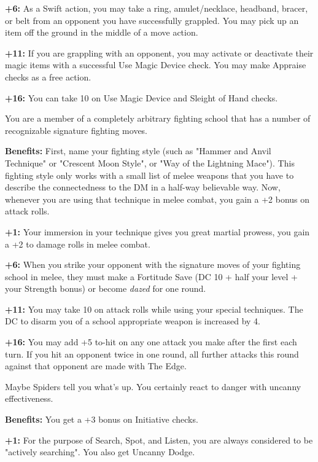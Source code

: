 \textbf{+6:} As a Swift action, you may take a ring, amulet/necklace, headband, bracer, or belt from an opponent you have successfully grappled. You may pick up an item off the ground in the middle of a move action.

\textbf{+11:} If you are grappling with an opponent, you may activate or deactivate their magic items with a successful Use Magic Device check. You may make Appraise checks as a free action.

\textbf{+16:} You can take 10 on Use Magic Device and Sleight of Hand checks.


You are a member of a completely arbitrary fighting school that has a number of recognizable signature fighting moves.

\textbf{Benefits:} First, name your fighting style (such as "Hammer and Anvil Technique" or "Crescent Moon Style", or "Way of the Lightning Mace"). This fighting style only works with a small list of melee weapons that you have to describe the connectedness to the DM in a half-way believable way. Now, whenever you are using that technique in melee combat, you gain a +2 bonus on attack rolls.

\textbf{+1:} Your immersion in your technique gives you great martial prowess, you gain a +2 to damage rolls in melee combat.

\textbf{+6:} When you strike your opponent with the signature moves of your fighting school in melee, they must make a Fortitude Save (DC 10 + half your level + your Strength bonus) or become \textit{dazed} for one round.

\textbf{+11:} You may take 10 on attack rolls while using your special techniques. The DC to disarm you of a school appropriate weapon is increased by 4.

\textbf{+16:} You may add +5 to-hit on any one attack you make after the first each turn. If you hit an opponent twice in one round, all further attacks this round against that opponent are made with The Edge.


Maybe Spiders tell you what's up. You certainly react to danger with uncanny effectiveness.

\textbf{Benefits:} You get a +3 bonus on Initiative checks.

\textbf{+1:} For the purpose of Search, Spot, and Listen, you are always considered to be "actively searching". You also get Uncanny Dodge.

